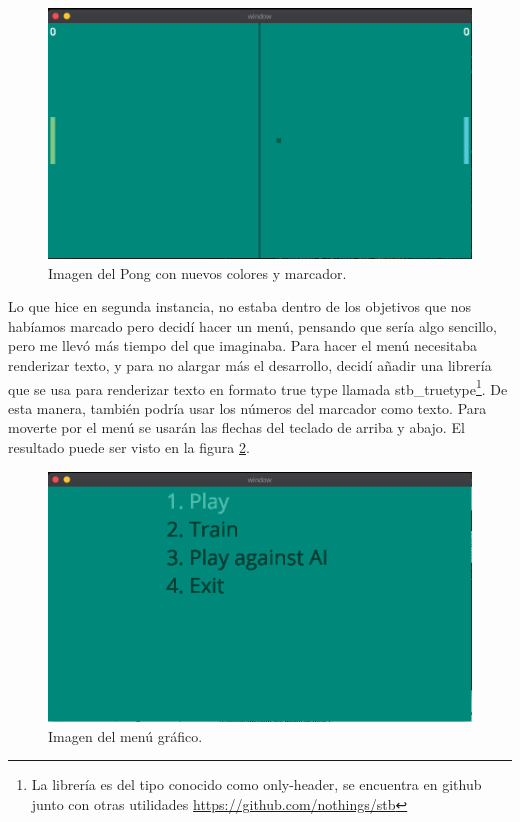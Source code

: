 \begin{figure}[H]
	\centering
	\includegraphics[width=12cm]{archivos/imagenes/pong-nuevos-colores.png}
	\caption{Imagen del Pong con nuevos colores y marcador.}
	\label{primera vista del pong plus}
\end{figure}

Lo que hice en segunda instancia, no estaba dentro de los objetivos que nos habíamos marcado pero decidí hacer un menú, pensando que sería algo sencillo, pero me llevó más tiempo del que imaginaba. Para hacer el menú necesitaba renderizar texto, y para no alargar más el desarrollo, decidí añadir una librería que se usa para renderizar texto en formato true type llamada stb\_truetype\footnote{La librería es del tipo conocido como only-header, se encuentra en github junto con otras utilidades \url{https://github.com/nothings/stb}}. De esta manera, también podría usar los números del marcador como texto. Para moverte por el menú se usarán las flechas del teclado de arriba y abajo. El resultado puede ser visto en la figura \ref{primer menu del juego}.

\begin{figure}[H]
	\centering
	\includegraphics[width=12cm]{archivos/imagenes/menu-grafico-integrado-en-el-juego.png}
	\caption{Imagen del menú gráfico.}
	\label{primer menu del juego}
\end{figure}

